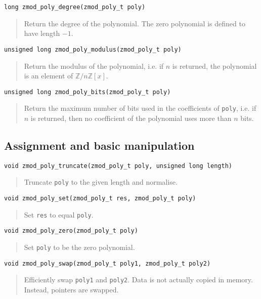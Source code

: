 \documentclass[a4paper,10pt]{article}
\newcommand{\Z}{\mathbb{Z}}
\newcommand{\code}{\lstinline}
\begin{document}
\begin{lstlisting}
long zmod_poly_degree(zmod_poly_t poly)
\end{lstlisting}
\begin{quote}
Return the degree of the polynomial. The zero polynomial is defined to have length $-1$.
\end{quote}

\begin{lstlisting}
unsigned long zmod_poly_modulus(zmod_poly_t poly)
\end{lstlisting}
\begin{quote}
Return the modulus of the polynomial, i.e. if $n$ is returned, the polynomial is an element of $\Z/n\Z[x]$.\end{quote}

\begin{lstlisting}
unsigned long zmod_poly_bits(zmod_poly_t poly)
\end{lstlisting}
\begin{quote}
Return the maximum number of bits used in the coefficients of \code{poly}, i.e. if $n$ is returned, then no coefficient of the polynomial uses more than $n$ bits.\end{quote}

\subsection{Assignment and basic manipulation}
\begin{lstlisting}
void zmod_poly_truncate(zmod_poly_t poly, unsigned long length)
\end{lstlisting}
\begin{quote}
Truncate \code{poly} to the given length and normalise.
\end{quote}

\begin{lstlisting}
void zmod_poly_set(zmod_poly_t res, zmod_poly_t poly)
\end{lstlisting}
\begin{quote}
Set \code{res} to equal \code{poly}.
\end{quote}

\begin{lstlisting}
void zmod_poly_zero(zmod_poly_t poly)
\end{lstlisting}
\begin{quote}
Set \code{poly} to be the zero polynomial.
\end{quote}

\begin{lstlisting}
void zmod_poly_swap(zmod_poly_t poly1, zmod_poly_t poly2)
\end{lstlisting}
\begin{quote}
Efficiently swap \code{poly1} and \code{poly2}. Data is not actually copied in memory. Instead, pointers are swapped.
\end{quote}
\end{document}
